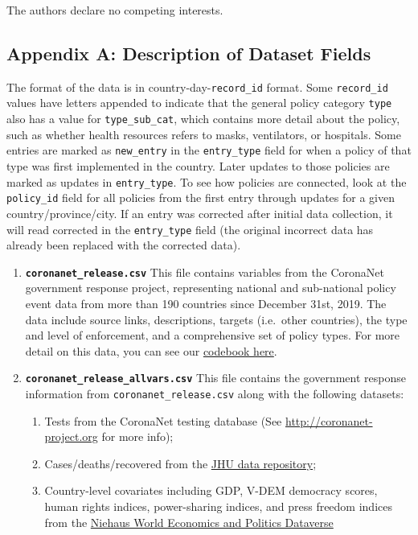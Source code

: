 \documentclass[]{article}
\providecommand{\tightlist}{%
  \setlength{\itemsep}{0pt}\setlength{\parskip}{0pt}}
\begin{document}
The authors declare no competing interests.

\hypertarget{appendix-a-description-of-dataset-fields}{%
\subsection*{Appendix A: Description of Dataset Fields}\label{appendix-a-description-of-dataset-fields}}

The format of the data is in country-day-\texttt{record\_id} format. Some \texttt{record\_id} values have letters appended to indicate that the general policy category \texttt{type} also has a value for \texttt{type\_sub\_cat}, which contains more detail about the policy, such as whether health resources refers to masks, ventilators, or hospitals. Some entries are marked as \texttt{new\_entry} in the \texttt{entry\_type} field for when a policy of that type was first implemented in the country. Later updates to those policies are marked as updates in \texttt{entry\_type}. To see how policies are connected, look at the \texttt{policy\_id} field for all policies from the first entry through updates for a given country/province/city. If an entry was corrected after initial data collection, it will read corrected in the \texttt{entry\_type} field (the original incorrect data has already been replaced with the corrected data).

\begin{enumerate}
\def\labelenumi{\arabic{enumi}.}
\item
  \textbf{\texttt{coronanet\_release.csv}} This file contains variables from the CoronaNet government response project, representing national and sub-national policy event data from more than 190 countries since December 31st, 2019. The data include source links, descriptions, targets (i.e.~other countries), the type and level of enforcement, and a comprehensive set of policy types. For more detail on this data, you can see our \href{https://docs.google.com/document/d/1zvNMpwj0onFvUZ_gLl4RRjqS-clbHv3TIX6EOHofsME}{codebook here}.
\item
  \textbf{\texttt{coronanet\_release\_allvars.csv}} This file contains the government response information from \texttt{coronanet\_release.csv} along with the following datasets:

  \begin{enumerate}
  \def\labelenumii{\alph{enumii}.}
  \tightlist
  \item
    Tests from the CoronaNet testing database (See \url{http://coronanet-project.org} for more info);
  \item
    Cases/deaths/recovered from the \href{https://github.com/CSSEGISandData/COVID-19}{JHU data repository};
  \item
    Country-level covariates including GDP, V-DEM democracy scores, human rights indices, power-sharing indices, and press freedom indices from the \href{https://niehaus.princeton.edu/news/world-economics-and-politics-dataverse}{Niehaus World Economics and Politics Dataverse}
  \end{enumerate}
\end{enumerate}
\end{document}
